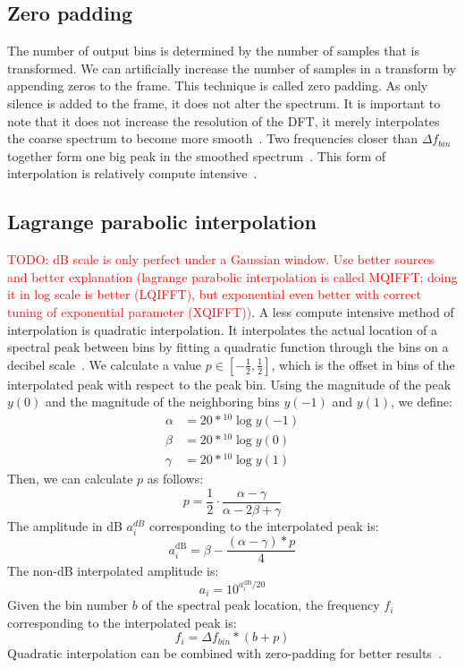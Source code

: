 \documentclass[10pt,twocolumn]{article}
\begin{document}
\subsection{Zero padding}
The number of output bins is determined by the number of samples that is transformed. We can artificially increase the number of samples in a transform by appending zeros to the frame. This technique is called zero padding. As only silence is added to the frame, it does not alter the spectrum. It is important to note that it does not increase the resolution of the DFT, it merely interpolates the coarse spectrum to become more smooth~\cite{zeropad1}. Two frequencies closer than $\Delta f_{bin}$ together form one big peak in the smoothed spectrum~\cite{zeropad2}. This form of interpolation is relatively compute intensive~\cite{interpolnozero}.

\subsection{Lagrange parabolic interpolation}
\textcolor{red}{TODO: dB scale is only perfect under a Gaussian window. Use better sources and better explanation (lagrange parabolic interpolation is called MQIFFT; doing it in log scale is better (LQIFFT), but exponential even better with correct tuning of exponential parameter (XQIFFT))}.
A less compute intensive method of interpolation is quadratic interpolation. It interpolates the actual location of a spectral peak between bins by fitting a quadratic function through the bins on a decibel scale~\cite{dbpolate, interpol}. We calculate a value $p \in [-\frac{1}{2}, \frac{1}{2}]$, which is the offset in bins of the interpolated peak with respect to the peak bin. Using the magnitude of the peak $y(0)$ and the magnitude of the neighboring bins $y(-1)$ and $y(1)$, we define:
\begin{align*}
    \alpha &= 20 * {}^{10}\!\log{y(-1)} \\
    \beta  &= 20 * {}^{10}\!\log{y(0)} \\
    \gamma &= 20 * {}^{10}\!\log{y(1)}
\end{align*}
Then, we can calculate $p$ as follows:
\[ p = \frac{1}{2} \cdot \frac{\alpha - \gamma}{\alpha - 2\beta + \gamma} \]
The amplitude in dB $a_i^{dB}$ corresponding to the interpolated peak is:
\[ a_i^{\text{dB}} = \beta - \frac{(\alpha - \gamma) * p}{4} \]
The non-dB interpolated amplitude is:
\[ a_i = 10^{a_i^{\text{dB}} / 20} \]
Given the bin number $b$ of the spectral peak location, the frequency $f_i$ corresponding to the interpolated peak is:
\[ f_i = \Delta f_{bin} * (b + p) \]
Quadratic interpolation can be combined with zero-padding for better results~\cite{interpolnozero}.
\end{document}
